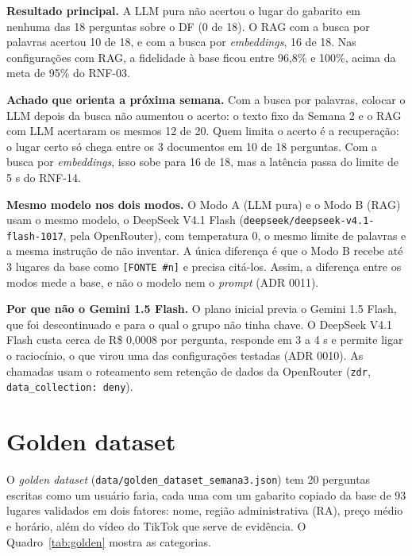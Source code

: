 \documentclass[11pt,a4paper]{article}
\newcommand{\codigo}[1]{\texttt{\small #1}}
\begin{document}
\textbf{Resultado principal.} A LLM pura não acertou o lugar do gabarito em nenhuma das 18 perguntas sobre o DF (0 de 18). O RAG com a busca por palavras acertou 10 de 18, e com a busca por \textit{embeddings}, 16 de 18. Nas configurações com RAG, a fidelidade à base ficou entre 96,8\% e 100\%, acima da meta de 95\% do RNF-03.

\textbf{Achado que orienta a próxima semana.} Com a busca por palavras, colocar o LLM depois da busca não aumentou o acerto: o texto fixo da Semana 2 e o RAG com LLM acertaram os mesmos 12 de 20. Quem limita o acerto é a recuperação: o lugar certo só chega entre os 3 documentos em 10 de 18 perguntas. Com a busca por \textit{embeddings}, isso sobe para 16 de 18, mas a latência passa do limite de 5 s do RNF-14.

\textbf{Mesmo modelo nos dois modos.} O Modo A (LLM pura) e o Modo B (RAG) usam o mesmo modelo, o DeepSeek V4.1 Flash (\codigo{deepseek/deepseek-v4.1-flash-1017}, pela OpenRouter), com temperatura 0, o mesmo limite de palavras e a mesma instrução de não inventar. A única diferença é que o Modo B recebe até 3 lugares da base como \codigo{[FONTE \#n]} e precisa citá-los. Assim, a diferença entre os modos mede a base, e não o modelo nem o \textit{prompt} (ADR 0011).

\textbf{Por que não o Gemini 1.5 Flash.} O plano inicial previa o Gemini 1.5 Flash, que foi descontinuado e para o qual o grupo não tinha chave. O DeepSeek V4.1 Flash custa cerca de R\$ 0,0008 por pergunta, responde em 3 a 4 s e permite ligar o raciocínio, o que virou uma das configurações testadas (ADR 0010). As chamadas usam o roteamento sem retenção de dados da OpenRouter (\codigo{zdr}, \codigo{data\_collection: deny}).

\section{Golden dataset}

O \textit{golden dataset} (\codigo{data/golden\_dataset\_semana3.json}) tem 20 perguntas escritas como um usuário faria, cada uma com um gabarito copiado da base de 93 lugares validados em dois fatores: nome, região administrativa (RA), preço médio e horário, além do vídeo do TikTok que serve de evidência. O Quadro~\ref{tab:golden} mostra as categorias.
\end{document}
